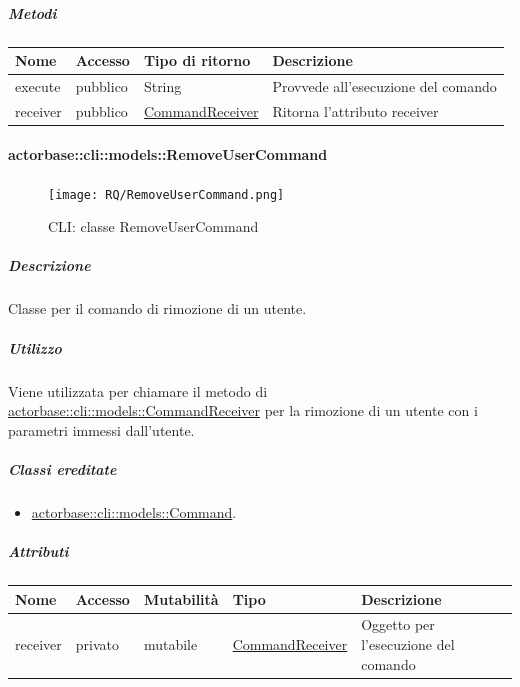 \documentclass{scalatekids-article}
\begin{document}
\subparagraph{Metodi}

\begin{tabular}{| p{3cm} | p{1.5cm} | p{3.5cm} | p{9cm} |}
  \hline
  Nome & Accesso & Tipo di ritorno & Descrizione\\
  \hline
  execute & pubblico & String & Provvede all'esecuzione del comando\\
  \hline
  receiver & pubblico & \hyperref[sec:actorbase::cli::models::CommandReceiver]{CommandReceiver} & Ritorna l'attributo receiver\\
  \hline
\end{tabular}

\paragraph{actorbase::cli::models::RemoveUserCommand}
\label{sec:actorbase::cli::models::RemoveUserCommand}

\begin{figure}[H]
  \begin{center}
    \texttt{[image: RQ/RemoveUserCommand.png]}
    \caption{CLI: classe RemoveUserCommand}
  \end{center}
\end{figure}

\subparagraph{Descrizione}

Classe per il comando di rimozione di un utente.

\subparagraph{Utilizzo}

Viene utilizzata per chiamare il metodo di
\hyperref[sec:actorbase::cli::models::CommandReceiver]{actorbase::cli::models::CommandReceiver} per la rimozione di un utente con i
parametri immessi dall'utente.

\subparagraph{Classi ereditate}

\begin{itemize}
\item \hyperref[sec:actorbase::cli::models::Command]{actorbase::cli::models::Command}.
\end{itemize}

\subparagraph{Attributi}

\begin{tabular}{| p{1cm} | p{1.5cm} | p{2cm} | p{4cm} | p{8.5cm} |}
  Nome & Accesso & Mutabilità & Tipo & Descrizione\\
  \hline
  receiver & privato & mutabile & \hyperref[sec:actorbase::cli::models::CommandReceiver]{CommandReceiver} & Oggetto per l'esecuzione del comando\\
  \hline
\end{tabular}
\end{document}
